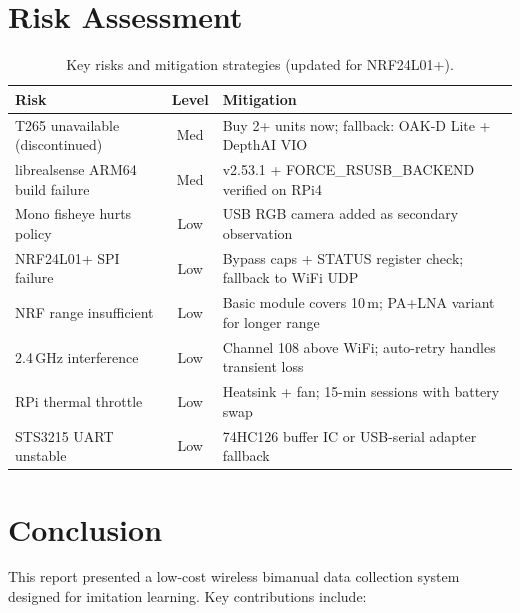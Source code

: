 \documentclass[11pt,a4paper]{article}
\begin{document}
\section{Risk Assessment}

\begin{table}[htbp]
\centering
\caption{Key risks and mitigation strategies (updated for NRF24L01+).}
\begin{tabular}{l c p{7cm}}
\toprule
\textbf{Risk} & \textbf{Level} & \textbf{Mitigation} \\
\midrule
T265 unavailable (discontinued) & Med & Buy 2+ units now; fallback: OAK-D Lite + DepthAI VIO \\
librealsense ARM64 build failure & Med & v2.53.1 + FORCE\_RSUSB\_BACKEND verified on RPi4 \\
Mono fisheye hurts policy & Low & USB RGB camera added as secondary observation \\
NRF24L01+ SPI failure & Low & Bypass caps + STATUS register check; fallback to WiFi UDP \\
NRF range insufficient & Low & Basic module covers 10\,m; PA+LNA variant for longer range \\
2.4\,GHz interference & Low & Channel 108 above WiFi; auto-retry handles transient loss \\
RPi thermal throttle & Low & Heatsink + fan; 15-min sessions with battery swap \\
STS3215 UART unstable & Low & 74HC126 buffer IC or USB-serial adapter fallback \\
\bottomrule
\end{tabular}
\label{tab:risks}
\end{table}


\section{Conclusion}

This report presented a low-cost wireless bimanual data collection system designed for imitation learning. Key contributions include:
\end{document}
